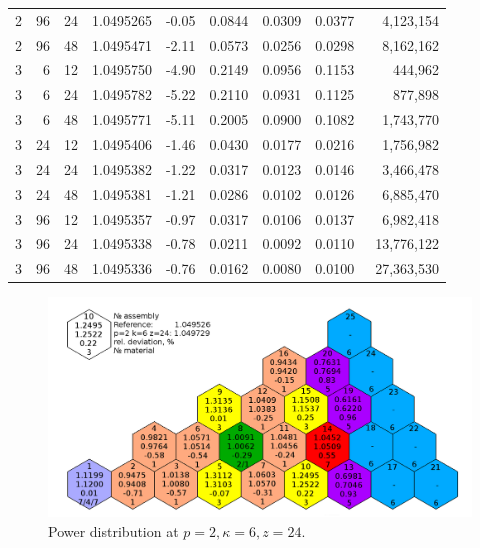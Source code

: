 \documentclass[runningheads,a4paper]{llncs}
\begin{document}
\begin{table}[htp]
\begin{center}
\begin{tabular}{rrrrrrrrr}
\rowcolor{col2}
2& 96& 24& 1.0495265& -0.05& 0.0844& 0.0309& 0.0377& 4,123,154\\
\rowcolor{col1}
2& 96& 48& 1.0495471& -2.11& 0.0573& 0.0256& 0.0298& 8,162,162\\
\rowcolor{col3}
3& 6& 12& 1.0495750& -4.90& 0.2149& 0.0956& 0.1153& 444,962 \\
\rowcolor{col2}
3& 6& 24& 1.0495782& -5.22& 0.2110& 0.0931& 0.1125& 877,898  \\
\rowcolor{col1}
3& 6& 48& 1.0495771& -5.11& 0.2005& 0.0900& 0.1082& 1,743,770\\
\rowcolor{col3}
3& 24& 12& 1.0495406& -1.46& 0.0430& 0.0177& 0.0216& 1,756,982\\
\rowcolor{col2}
3& 24& 24& 1.0495382& -1.22& 0.0317& 0.0123& 0.0146& 3,466,478\\
\rowcolor{col1}
3& 24& 48& 1.0495381& -1.21& 0.0286& 0.0102& 0.0126& 6,885,470\\
\rowcolor{col3}
3& 96& 12& 1.0495357& -0.97& 0.0317& 0.0106& 0.0137& 6,982,418\\
\rowcolor{col2}
3& 96& 24& 1.0495338& -0.78& 0.0211& 0.0092& 0.0110& 13,776,122\\
\rowcolor{col1}
3& 96& 48& 1.0495336& -0.76& 0.0162& 0.0080& 0.0100& ~27,363,530\\
\end{tabular}
\end{center}
\end{table}

\begin{figure}[htp]
  \begin{center}
    \includegraphics[width=1\linewidth] {power.png}
	\caption{Power distribution at $p=2, \kappa=6, z=24$.}
	\label{fig:3}
  \end{center}
\end{figure}
\end{document}
